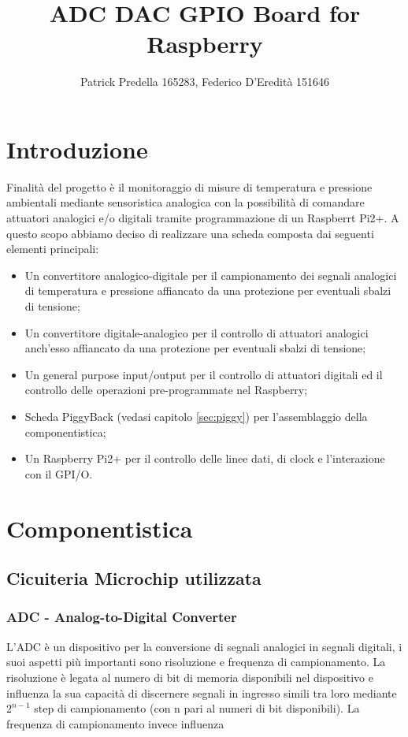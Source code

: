 \documentclass[10pt]{article}
\title{ADC DAC GPIO Board for Raspberry}
\author{Patrick Predella 165283, Federico D'Eredità 151646 }
\date{}
\begin{document}
\maketitle
\tableofcontents

\section{Introduzione}
Finalità del progetto è il monitoraggio di misure di temperatura e pressione ambientali mediante sensoristica analogica con la possibilità di comandare attuatori analogici e/o digitali tramite programmazione di un Raspberrt Pi2+.
A questo scopo abbiamo deciso di realizzare una scheda composta dai seguenti elementi principali:
\begin{itemize}
\item Un convertitore analogico-digitale per il campionamento dei segnali analogici di temperatura e pressione affiancato da una protezione per eventuali sbalzi di tensione;
\item Un convertitore digitale-analogico per il controllo di attuatori analogici anch'esso affiancato da una protezione per eventuali sbalzi di tensione;
\item Un general purpose input/output per il controllo di attuatori digitali ed il controllo delle operazioni pre-programmate nel Raspberry;
\item Scheda PiggyBack (vedasi capitolo \ref{sec:piggy}) per l'assemblaggio della componentistica;
\item Un Raspberry Pi2+ per il controllo delle linee dati, di clock e l'interazione con il GPI/O.
\end{itemize}


\section{Componentistica}
	\subsection{Cicuiteria Microchip utilizzata}

		\subsubsection{ADC - Analog-to-Digital Converter}\label{sec:adc}
		L'ADC è un dispositivo per la conversione di segnali analogici in segnali digitali, i suoi aspetti più importanti sono risoluzione e frequenza di campionamento.
		La risoluzione è legata al numero di bit di memoria disponibili nel dispositivo e influenza la sua capacità di discernere segnali in ingresso simili tra loro mediante $2^{n-1}$ step di campionamento (con n pari al numeri di bit disponibili). La frequenza di campionamento invece influenza 
\end{document}
